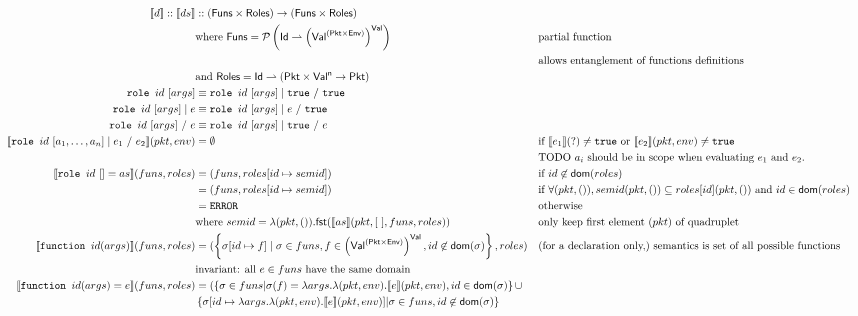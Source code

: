 \documentclass{report}
\newcommand\sem[1]{\llbracket #1\rrbracket}
\newcommand{\pkt}{\ensuremath{pkt}}
\newcommand{\env}{\ensuremath{env}}
\newcommand{\true}{\texttt{true}}
\newcommand{\ERROR}{\texttt{ERROR}}
\begin{document}
\begin{align*}
\sem{d} :: \sem{ds} & :: ({\sf Funs}\times{\sf Roles})\rightarrow ({\sf Funs}\times{\sf Roles})
\\
& \text{where }{\sf Funs} = 
\mathcal{P}\left({\sf Id}\rightharpoonup\left(
  {\sf Val}^{({\sf Pkt}\times{\sf Env})}\right)^{\sf Val}\right)
&& \text{partial function}\\
&&& \text{allows entanglement of functions definitions}\\
& \text{and }{\sf Roles} = {\sf Id}\rightharpoonup({\sf Pkt}\times{\sf Val^n}\rightarrow{\sf Pkt})
\\
\texttt{role }id \ [args] & \equiv\texttt{role }id \ [args] \mid\true\ /\ \true\\
\texttt{role }id \ [args] \mid e& \equiv\texttt{role }id \ [args] \mid e\ /\ \true\\
\texttt{role }id \ [args] \ /\ e& \equiv\texttt{role }id \ [args] \mid\true\ /\ e\\
\sem{\texttt{role }id \ [a_1,\ldots,a_n] \mid e_1\ /\ e_2}(\pkt,\env) & = \emptyset &&
\text{if $\sem{e_1}(?)\neq\true$ or $\sem{e_2}(\pkt,\env)\neq\true$}\\
&& &\text{TODO $a_i$ should be in scope when evaluating $e_1$ and $e_2$.}\\
\sem{\texttt{role }id \ [] = as}(funs,roles) & = 
(funs,roles[id\mapsto semid]) &&
\text{if $id\not\in{\sf dom}(roles)$}\\
& = (funs,roles[id\mapsto semid]) &&
\text{if $\forall(pkt,()),semid(\pkt,())\subseteq roles[id](\pkt,())$ and 
$id\in{\sf dom}(roles)$ }\\
& = \ERROR && \text{otherwise}\\
&\rlap{where $semid=\lambda(\pkt,()).{\sf fst}(\sem{as}(\pkt,[\ ],funs,roles))$}
&& \text{only keep first element ($pkt$) of quadruplet}
\\
\sem{\texttt{function }id(args)}(funs, roles) & = 
(\left\{\sigma[id\mapsto f]\mid \sigma\in funs, f\in\left({\sf Val}^{({\sf Pkt}\times{\sf Env})}\right)^{\sf Val}, id\not\in{\sf dom}(\sigma)\right\},roles)
&& 
\text{(for a declaration only,) semantics is set of all possible functions}\\
& \text{invariant: all $e\in funs$ have the same domain}\\
\sem{\texttt{function }id(args)=e}(funs, roles) & = 
(\left\{\sigma\in funs | \sigma(f)=\lambda args.\lambda (\pkt,\env).\sem{e}(\pkt,\env), id\in{\sf dom}(\sigma)\right\}\cup\\
&\left\{\sigma[id\mapsto\lambda args.\lambda (\pkt,\env).\sem{e}(\pkt,\env)] | \sigma\in funs, id\not\in{\sf dom}(\sigma)\right\}\\

\end{align*}
\end{document}
